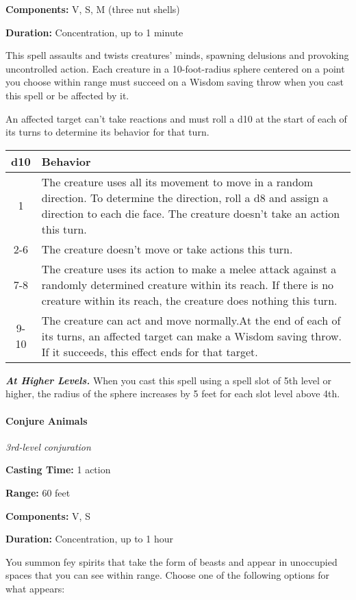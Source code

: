 \documentclass[
]{article}
\begin{document}
\textbf{Components:} V, S, M (three nut shells)

\textbf{Duration:} Concentration, up to 1 minute

This spell assaults and twists creatures' minds, spawning delusions and
provoking uncontrolled action. Each creature in a 10-foot-radius sphere
centered on a point you choose within range must succeed on a Wisdom
saving throw when you cast this spell or be affected by it.

An affected target can't take reactions and must roll a d10 at the start
of each of its turns to determine its behavior for that turn.

\begin{longtable}[]{@{}cl@{}}
\toprule
d10 & Behavior\tabularnewline
\midrule
\endhead
1 & The creature uses all its movement to move in a random direction. To
determine the direction, roll a d8 and assign a direction to each die
face. The creature doesn't take an action this turn.\tabularnewline
2-6 & The creature doesn't move or take actions this
turn.\tabularnewline
7-8 & The creature uses its action to make a melee attack against a
randomly determined creature within its reach. If there is no creature
within its reach, the creature does nothing this turn.\tabularnewline
9-10 & The creature can act and move normally.At the end of each of its
turns, an affected target can make a Wisdom saving throw. If it
succeeds, this effect ends for that target.\tabularnewline
\bottomrule
\end{longtable}

\emph{\textbf{At Higher Levels.}} When you cast this spell using a spell
slot of 5th level or higher, the radius of the sphere increases by 5
feet for each slot level above 4th.

\hypertarget{conjure-animals}{%
\paragraph{Conjure Animals}\label{conjure-animals}}

\emph{3rd-level conjuration}

\textbf{Casting Time:} 1 action

\textbf{Range:} 60 feet

\textbf{Components:} V, S

\textbf{Duration:} Concentration, up to 1 hour

You summon fey spirits that take the form of beasts and appear in
unoccupied spaces that you can see within range. Choose one of the
following options for what appears:
\end{document}
